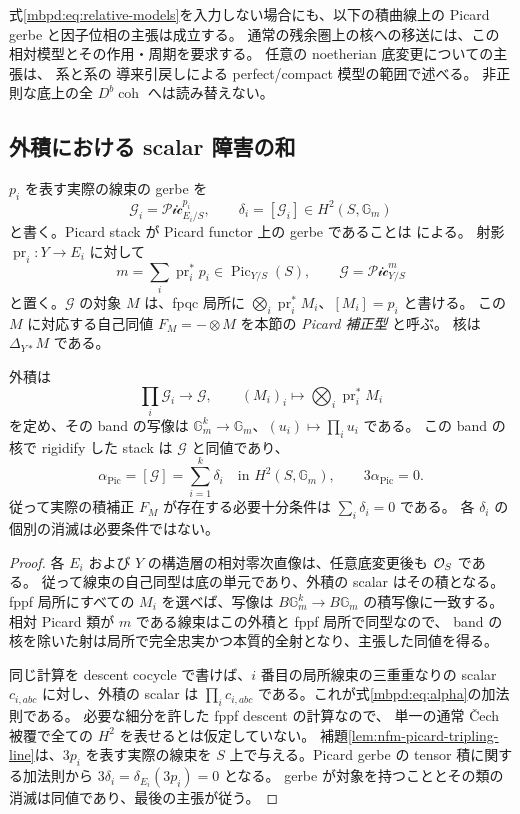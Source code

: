 式\eqref{mbpd:eq:relative-models}を入力しない場合にも、以下の積曲線上の
Picard gerbe と因子位相の主張は成立する。
通常の残余圏上の核への移送には、この相対模型とその作用・周期を要求する。
任意の noetherian 底変更についての主張は、
系と系の
導来引戻しによる perfect/compact 模型の範囲で述べる。
非正則な底上の全 $D^b\operatorname{coh}$ へは読み替えない。

\subsection{外積における scalar 障害の和}

$p_i$ を表す実際の線束の gerbe を
\[
 \mathscr G_i=\mathcal{Pic}^{p_i}_{E_i/S},\qquad
 \delta_i=[\mathscr G_i]\in H^2(S,\mathbb G_m)
\]
と書く。Picard stack が Picard functor 上の gerbe であることは
\cite{NFMStacksPicardGerbe}による。
射影 $\operatorname{pr}_i:Y\to E_i$ に対して
\[
 m=\sum_i\operatorname{pr}_i^*p_i\in\operatorname{Pic}_{Y/S}(S),
 \qquad \mathscr G=\mathcal{Pic}^{m}_{Y/S}
\]
と置く。$\mathscr G$ の対象 $M$ は、fpqc 局所に
$\bigotimes_i\operatorname{pr}_i^*M_i$、$[M_i]=p_i$ と書ける。
この $M$ に対応する自己同値
$F_M=-\otimes M$ を本節の \emph{Picard 補正型} と呼ぶ。
核は $\Delta_{Y*}M$ である。

\begin{proposition}
\label{mbpd:prop:product-gerbe}
外積は
\[
 \prod_i\mathscr G_i\longrightarrow\mathscr G,
 \qquad (M_i)_i\longmapsto\bigotimes_i\operatorname{pr}_i^*M_i
\]
を定め、その band の写像は
$\mathbb G_m^k\to\mathbb G_m$、$(u_i)\mapsto\prod_i u_i$ である。
この band の核で rigidify した stack は $\mathscr G$ と同値であり、
\begin{equation}\label{mbpd:eq:alpha}
 \alpha_{\mathrm{Pic}}=[\mathscr G]
       =\sum_{i=1}^k\delta_i\quad\text{in }H^2(S,\mathbb G_m),
 \qquad 3\alpha_{\mathrm{Pic}}=0.
\end{equation}
従って実際の積補正 $F_M$ が存在する必要十分条件は
$\sum_i\delta_i=0$ である。
各 $\delta_i$ の個別の消滅は必要条件ではない。
\end{proposition}
\begin{proof}
各 $E_i$ および $Y$ の構造層の相対零次直像は、任意底変更後も $\mathcal O_S$ である。
従って線束の自己同型は底の単元であり、外積の scalar はその積となる。
fppf 局所にすべての $M_i$ を選べば、写像は
$B\mathbb G_m^k\to B\mathbb G_m$ の積写像に一致する。
相対 Picard 類が $m$ である線束はこの外積と fppf 局所で同型なので、
band の核を除いた射は局所で完全忠実かつ本質的全射となり、主張した同値を得る。

同じ計算を descent cocycle で書けば、$i$ 番目の局所線束の三重重なりの
scalar $c_{i,abc}$ に対し、外積の scalar は
$\prod_i c_{i,abc}$ である。これが式\eqref{mbpd:eq:alpha}の加法則である。
必要な細分を許した fppf descent の計算なので、
単一の通常 \v{C}ech 被覆で全ての $H^2$ を表せるとは仮定していない。
補題\ref{lem:nfm-picard-tripling-line}は、$3p_i$ を表す実際の線束を
$S$ 上で与える。Picard gerbe の tensor 積に関する加法則から
$3\delta_i=\delta_{E_i}(3p_i)=0$ となる。
gerbe が対象を持つこととその類の消滅は同値であり、最後の主張が従う。
\end{proof}

